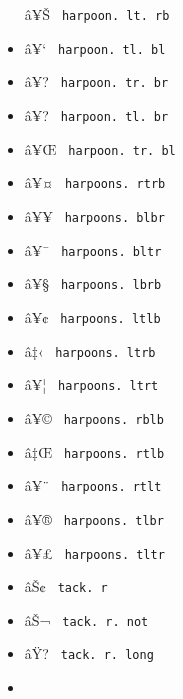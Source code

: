 \begin{itemize}
  \label{symbol-harpoon.lt.rb}{{ â¥Š }
  \texttt{\ harpoon.\ lt.\ rb\ }}
\item
  \label{symbol-harpoon.tl.bl}{{ â¥` }
  \texttt{\ harpoon.\ tl.\ bl\ }}
\item
  \label{symbol-harpoon.tr.br}{{ â¥? }
  \texttt{\ harpoon.\ tr.\ br\ }}
\item
  \label{symbol-harpoon.tl.br}{{ â¥? }
  \texttt{\ harpoon.\ tl.\ br\ }}
\item
  \label{symbol-harpoon.tr.bl}{{ â¥Œ }
  \texttt{\ harpoon.\ tr.\ bl\ }}
\item
  \label{symbol-harpoons.rtrb}{{ â¥¤ }
  \texttt{\ harpoons.\ rtrb\ }}
\item
  \label{symbol-harpoons.blbr}{{ â¥¥ }
  \texttt{\ harpoons.\ blbr\ }}
\item
  \label{symbol-harpoons.bltr}{{ â¥¯ }
  \texttt{\ harpoons.\ bltr\ }}
\item
  \label{symbol-harpoons.lbrb}{{ â¥§ }
  \texttt{\ harpoons.\ lbrb\ }}
\item
  \label{symbol-harpoons.ltlb}{{ â¥¢ }
  \texttt{\ harpoons.\ ltlb\ }}
\item
  \label{symbol-harpoons.ltrb}{{ â‡‹ }
  \texttt{\ harpoons.\ ltrb\ }}
\item
  \label{symbol-harpoons.ltrt}{{ â¥¦ }
  \texttt{\ harpoons.\ ltrt\ }}
\item
  \label{symbol-harpoons.rblb}{{ â¥© }
  \texttt{\ harpoons.\ rblb\ }}
\item
  \label{symbol-harpoons.rtlb}{{ â‡Œ }
  \texttt{\ harpoons.\ rtlb\ }}
\item
  \label{symbol-harpoons.rtlt}{{ â¥¨ }
  \texttt{\ harpoons.\ rtlt\ }}
\item
  \label{symbol-harpoons.tlbr}{{ â¥® }
  \texttt{\ harpoons.\ tlbr\ }}
\item
  \label{symbol-harpoons.tltr}{{ â¥£ }
  \texttt{\ harpoons.\ tltr\ }}
\item
  \label{symbol-tack.r}{{ âŠ¢ } \texttt{\ tack.\ r\ }}
\item
  \label{symbol-tack.r.not}{{ âŠ¬ }
  \texttt{\ tack.\ r.\ not\ }}
\item
  \label{symbol-tack.r.long}{{ âŸ? }
  \texttt{\ tack.\ r.\ long\ }}
\item

\end{itemize}
